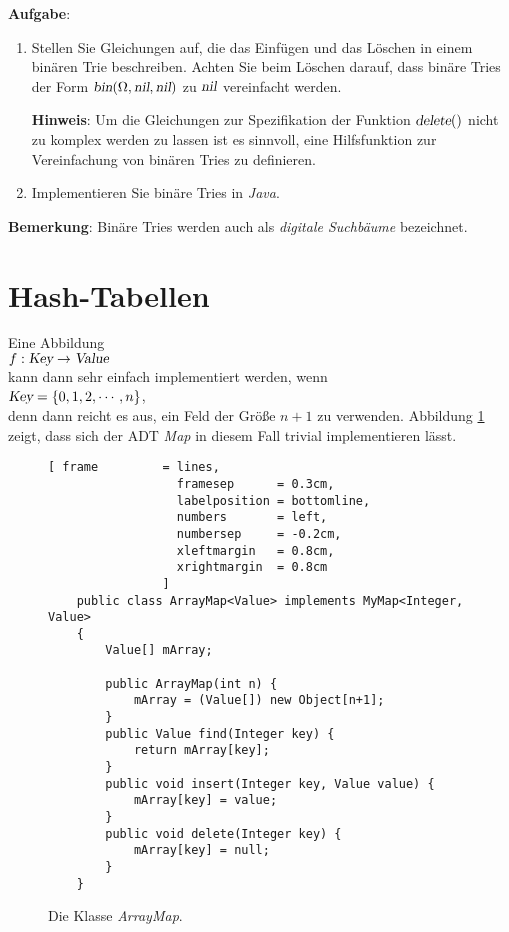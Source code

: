 \textbf{Aufgabe}: 
\begin{enumerate}
\item Stellen Sie Gleichungen auf, die das Einf\"ugen und das L\"oschen in einem
      bin\"aren Trie beschreiben.  Achten Sie beim L\"oschen darauf,
      dass bin\"are Tries der Form $\textsl{bin}(\Omega, \textsl{nil}, \textsl{nil})$
      zu $\textsl{nil}$ vereinfacht werden.

      \textbf{Hinweis}:  Um die Gleichungen zur Spezifikation der Funktion
      $\textsl{delete}()$ nicht zu komplex werden zu lassen ist es sinnvoll, eine
      Hilfsfunktion zur Vereinfachung von bin\"aren Tries zu definieren.
\item Implementieren Sie bin\"are Tries in \textsl{Java}.
\end{enumerate}
\textbf{Bemerkung}: Bin\"are Tries werden auch als \emph{digitale Suchb\"aume} bezeichnet.
\pagebreak


\section{Hash-Tabellen}
Eine Abbildung \\[0.2cm]
\hspace*{1.3cm} $f: \textsl{Key} \rightarrow \textsl{Value}$ \\[0.2cm]
kann dann sehr einfach implementiert werden, wenn \\[0.2cm]
\hspace*{1.3cm} $\textsl{Key} = \{ 0, 1, 2, \cdots, n \}$, \\[0.2cm]
denn dann reicht es aus, ein Feld der Gr\"o{\ss}e $n+1$ zu verwenden.
Abbildung \ref{fig:ArrayMap} zeigt, dass sich der ADT \textsl{Map} 
in diesem Fall trivial implementieren l\"asst.

\begin{figure}[!ht]
  \centering
\begin{Verbatim}[ frame         = lines, 
                  framesep      = 0.3cm, 
                  labelposition = bottomline,
                  numbers       = left,
                  numbersep     = -0.2cm,
                  xleftmargin   = 0.8cm,
                  xrightmargin  = 0.8cm
                ]
    public class ArrayMap<Value> implements MyMap<Integer, Value>
    {
        Value[] mArray;
        
        public ArrayMap(int n) {
            mArray = (Value[]) new Object[n+1];
        }
        public Value find(Integer key) {
            return mArray[key];
        }
        public void insert(Integer key, Value value) {
            mArray[key] = value;
        }
        public void delete(Integer key) {
            mArray[key] = null;
        }
    }
\end{Verbatim}
\vspace*{-0.3cm}
  \caption{Die Klasse \textsl{ArrayMap}.}
  \label{fig:ArrayMap}
\end{figure}


